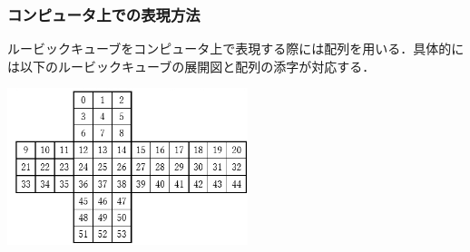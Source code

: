 \documentclass{jsarticle}
\begin{document}
\subsubsection{コンピュータ上での表現方法}
ルービックキューブをコンピュータ上で表現する際には配列を用いる．具体的には以下のルービックキューブの展開図と配列の添字が対応する．\\

\begin{center}
  \includegraphics[width=7cm]{./tex_pic/seq.jpg}\\
\end{center}
    
\end{document}
